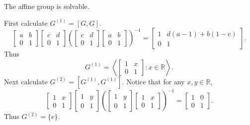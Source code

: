 \documentclass[12pt]{report}
\begin{document}
\begin{example}
The affine group is solvable.
\end{example}
\proof
First calculate $G^{(1)} = [G,G]$.
\[
\begin{bmatrix}a & b \\ 0 & 1 \end{bmatrix}
\begin{bmatrix}c & d \\ 0 & 1 \end{bmatrix}
\left( \begin{bmatrix}c & d \\ 0 & 1 \end{bmatrix} \begin{bmatrix}a & b \\ 0 & 1 \end{bmatrix} \right)^{-1}
=
\begin{bmatrix} 1 & d(a-1) + b(1-c) \\ 0 & 1\end{bmatrix}.
\]
Thus
\[
G^{(1)} = \left<\begin{bmatrix} 1 & x\\0 & 1\end{bmatrix}:x\in\mathbb{R}\right>.
\]
Next calculate $G^{(2)} = [G^{(1)},G^{(1)}]$.
Notice that for any $x,y\in \mathbb{R}$,
\[
\begin{bmatrix}1 & x \\ 0 & 1 \end{bmatrix}
\begin{bmatrix}1 & y \\ 0 & 1 \end{bmatrix}
\left(\begin{bmatrix}1 & y \\ 0 & 1 \end{bmatrix} \begin{bmatrix}1 & x \\ 0 & 1 \end{bmatrix}\right)^{-1}
= \begin{bmatrix} 1 & 0\\0 & 1\end{bmatrix}.
\]
Thus $G^{(2)} = \{e\}$.
\done
\end{document}
